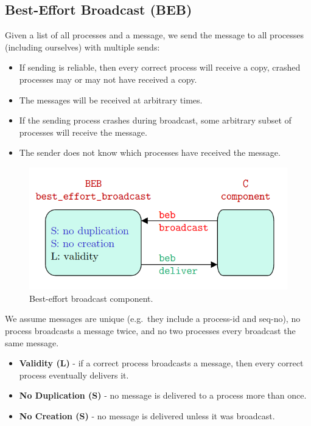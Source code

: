 \documentclass[11pt]{article}
\begin{document}
\subsection{Best-Effort Broadcast (BEB)}
Given a list of all processes and a message, we send the message to all processes (including ourselves) with multiple sends:
\begin{itemize}
  \item If sending is reliable, then every correct process will receive a copy, crashed processes may or may not have received a copy.
  \item The messages will be received at arbitrary times.
  \item If the sending process crashes during broadcast, some arbitrary subset of processes will receive the message.
  \item The sender does not know which processes have received the message.
\end{itemize}

\begin{figure}[htb!]
  \centering
  \caption{Best-effort broadcast component.}
  \includegraphics[scale=0.3]{beb}
\end{figure}

We assume messages are unique (e.g.\ they include a process-id and seq-no), no process broadcasts a message twice, and no two processes every broadcast the same message.

\begin{itemize}
  \item \textbf{Validity (L)} - if a correct process broadcasts a message, then every correct process eventually delivers it.
  \item \textbf{No Duplication (S)} - no message is delivered to a process more than once.
  \item \textbf{No Creation (S)} - no message is delivered unless it was broadcast.
\end{itemize}
\end{document}
